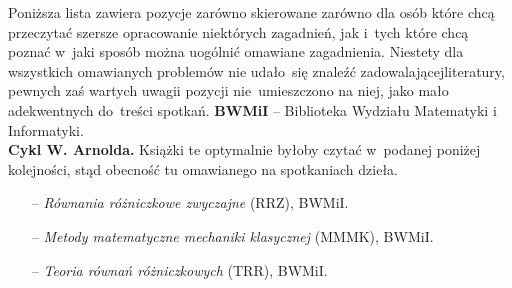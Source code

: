 \documentclass[a4paper,11pt]{article}
\begin{document}
\noindent
Poniższa lista zawiera pozycje zarówno skierowane zarówno dla osób które chcą przeczytać szersze opracowanie niektórych zagadnień, jak i~tych które chcą poznać w~jaki sposób można uogólnić omawiane zagadnienia. Niestety dla wszystkich omawianych problemów nie udało~się znaleźć zadowalającej\linebreak literatury, pewnych zaś wartych uwagii pozycji nie~umieszczono na niej, jako mało adekwentnych do~treści spotkań.
\newline
\noindent
\textbf{BWMiI} -- Biblioteka Wydziału Matematyki i Informatyki. \\
\newline
\noindent
\textbf{Cykl W. Arnolda.} Książki te optymalnie byłoby czytać w~podanej poniżej kolejności, stąd obecność tu omawianego na spotkaniach dzieła.
\begin{itemize}
\item[--] \emph{Równania różniczkowe zwyczajne} (RRZ), BWMiI.
\item[--] \emph{Metody matematyczne mechaniki klasycznej} (MMMK), BWMiI. %
\item[--] \emph{Teoria równań różniczkowych} (TRR), BWMiI.
\end{itemize}
\end{document}

